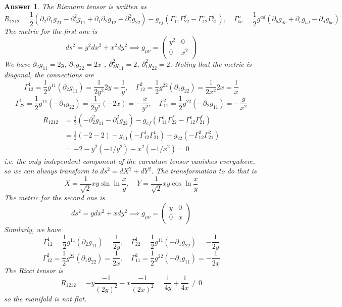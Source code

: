 \documentclass[a4paper]{article}
\theoremstyle{new2}
\newtheorem{ans}{Answer}[section]
\theoremstyle{new}
\begin{document}
\begin{ans}
The Riemann tensor is written as
$$R_{1212}=\frac{1}{2}(\partial_2\partial_1g_{21}-\partial_2^2g_{11}+\partial_1\partial_2g_{12}-\partial_1^2g_{22})-g_{ef}(\Gamma^e_{11}\Gamma^f_{22}-\Gamma^e_{12}\Gamma_{21}^f),\quad\Gamma^a_{bc}=\frac{1}{2}g^{ad}(\partial_bg_{dc}+\partial_cg_{bd}-\partial_dg_{bc})$$
The metric for the first one is
$$ds^2=y^2dx^2+x^2dy^2\implies g_{\mu\nu}=\begin{pmatrix}y^2&0\\0&x^2\\\end{pmatrix}$$
We have $\partial_2g_{11}=2y$, $\partial_1g_{22}=2x$
, $\partial_2^2g_{11}=2$, $\partial_1^2g_{22}=2$. Noting that the metric is diagonal, the connections are
$$\Gamma_{12}^1=\frac{1}{2}g^{11}(\partial_2g_{11})=\frac{1}{2y^2}2y=\frac{1}{y},\quad\Gamma_{12}^2=\frac{1}{2}g^{22}(\partial_1g_{22})=\frac{1}{2x^2}2x=\frac{1}{x}$$
$$\Gamma_{22}^1=\frac{1}{2}g^{11}(-\partial_1g_{22})=\frac{1}{2y^2}(-2x)=-\frac{x}{y^2},\quad\Gamma_{11}^2=\frac{1}{2}g^{22}(-\partial_2g_{11})=-\frac{y}{x^2}$$
\begin{align}
R_{1212}&=\frac{1}{2}(-\partial_2^2g_{11}-\partial_1^2g_{22})-g_{ef}(\Gamma^e_{11}\Gamma_{22}^f-\Gamma_{12}^e\Gamma_{21}^f)\nonumber\\&=\frac{1}{2}(-2-2)-g_{11}(-\Gamma^1_{12}\Gamma^1_{21})-g_{22}(-\Gamma_{12}^2\Gamma_{21}^2)\nonumber\\&=-2-y^2(-1/y^2)-x^2(-1/x^2)=0\nonumber
\end{align}
i.e. the only independent component of the curvature tensor vanishes everywhere, so we can always transform to $ds^2=dX^2+dY^2$. The transformation to do that is
$$X=\frac{1}{\sqrt{2}}xy\sin\ln\frac{x}{y},\quad Y=\frac{1}{\sqrt{2}}xy\cos\ln\frac{x}{y}$$
The metric for the second one is
$$ds^2=ydx^2+xdy^2\implies g_{\mu\nu}=\begin{pmatrix}y&0\\0&x\\\end{pmatrix}$$
Similarly, we have
$$\Gamma_{12}^1=\frac{1}{2}g^{11}(\partial_2g_{11})=\frac{1}{2y},\quad\Gamma_{22}^1=\frac{1}{2}g^{11}(-\partial_1g_{22})=-\frac{1}{2y}$$
$$\Gamma_{12}^2=\frac{1}{2}g^{22}(\partial_1g_{22})=\frac{1}{2x},\quad\Gamma_{11}^2=\frac{1}{2}g^{22}(-\partial_1g_{11})=-\frac{1}{2x}$$
The Ricci tensor is
$$R_{1212}=-y\frac{-1}{(2y)^2}-x\frac{-1}{(2x)^2}=\frac{1}{4y}+\frac{1}{4x}\neq 0$$
so the manifold is not flat.
\end{ans}
\newpage
\end{document}
